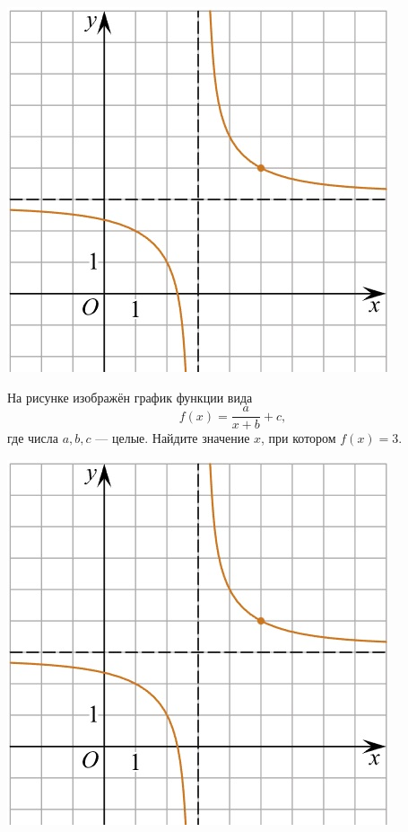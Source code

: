 \begin{class}[number=9]
\begin{listofex}
\begin{minipage}[t]{\picwidth}
			\includegraphics[align=t, width=\linewidth]{../../pics/G101M4C6-2}
		\end{minipage}
		\item
		\begin{minipage}[t]{\bodywidth}
			На рисунке изображён график функции вида \[ f(x)=\dfrac{a}{x+b}+c, \] где числа \(a, b, c\) --- целые. Найдите значение \(x\), при котором \(f(x)=3\).
		\end{minipage}
		\hspace{0.02\linewidth}
		\begin{minipage}[t]{\picwidth}
			\includegraphics[align=t, width=\linewidth]{../../pics/G101M4C6-2}

\end{minipage}
\end{listofex}
\end{class}
